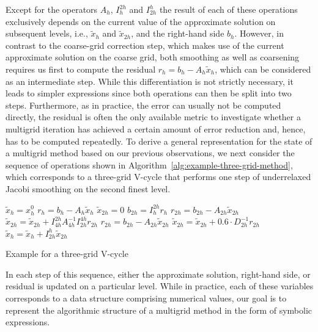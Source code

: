 Except for the operators $A_h$, $I_h^{2h}$ and $I_{2h}^h$ the result of each of these operations exclusively depends on the current value of the approximate solution on subsequent levels, i.e., $\tilde{x}_{h}$ and $\tilde{x}_{2h}$, and the right-hand side $b_h$.
However, in contrast to the coarse-grid correction step, which makes use of the current approximate solution on the coarse grid, both smoothing as well as coarsening requires us first to compute the residual $r_h = b_h - A_h \tilde{x}_h$, which can be considered as an intermediate step.
While this differentiation is not strictly necessary, it leads to simpler expressions since both operations can then be split into two steps.
Furthermore, as in practice, the error can usually not be computed directly, the residual is often the only available metric to investigate whether a multigrid iteration has achieved a certain amount of error reduction and, hence, has to be computed repeatedly.
To derive a general representation for the state of a multigrid method based on our previous observations, we next consider the sequence of operations shown in Algorithm~\ref{alg:example-three-grid-method}, which corresponds to a three-grid V-cycle that performs one step of underrelaxed Jacobi smoothing on the second finest level.
\begin{algorithm}
	\begin{algorithmic}[1]
		\State $\tilde{x}_{h} = x_{h}^{0}$
		\State $r_{h} = b_{h} - A_h \tilde{x}_{h} $
		\State $ \tilde{x}_{2h} = 0$
		\State $ b_{2h} = I_{h}^{2h} r_{h}$
		\State $ r_{2h} = b_{2h} - A_{2h} \tilde{x}_{2h}$
		\State $ \tilde{x}_{2h} = \tilde{x}_{2h} + I_{4h}^{2h} A_{4h}^{-1} I_{2h}^{4h} r_{2h}$
		\State $ r_{2h} = b_{2h} - A_{2h} \tilde{x}_{2h}$
		\State $ \tilde{x}_{2h} = \tilde{x}_{2h} + 0.6 \cdot D_{2h}^{-1} r_{2h}$
		\State $\tilde{x}_{h} = \tilde{x}_{h}  + I_{2h}^h \tilde{x}_{2h}$
	\end{algorithmic}
\caption{Example for a three-grid V-cycle}
\label{alg:example-three-grid-method}
\end{algorithm}
In each step of this sequence, either the approximate solution, right-hand side, or residual is updated on a particular level.
While in practice, each of these variables corresponds to a data structure comprising numerical values, our goal is to represent the algorithmic structure of a multigrid method in the form of symbolic expressions.

